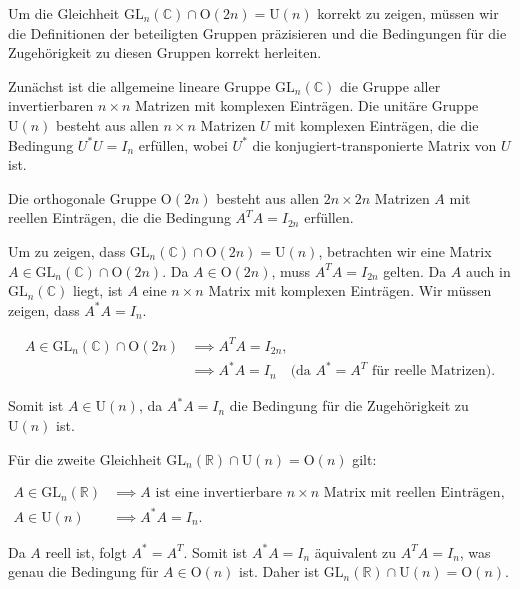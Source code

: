 Um die Gleichheit $\mathrm{GL}_n(\mathbb{C}) \cap \mathrm{O}(2n) = \mathrm{U}(n)$ korrekt zu zeigen, müssen wir die Definitionen der beteiligten Gruppen präzisieren und die Bedingungen für die Zugehörigkeit zu diesen Gruppen korrekt herleiten.

Zunächst ist die allgemeine lineare Gruppe $\mathrm{GL}_n(\mathbb{C})$ die Gruppe aller invertierbaren $n \times n$ Matrizen mit komplexen Einträgen. Die unitäre Gruppe $\mathrm{U}(n)$ besteht aus allen $n \times n$ Matrizen $U$ mit komplexen Einträgen, die die Bedingung $U^* U = I_n$ erfüllen, wobei $U^*$ die konjugiert-transponierte Matrix von $U$ ist.

Die orthogonale Gruppe $\mathrm{O}(2n)$ besteht aus allen $2n \times 2n$ Matrizen $A$ mit reellen Einträgen, die die Bedingung $A^T A = I_{2n}$ erfüllen.

Um zu zeigen, dass $\mathrm{GL}_n(\mathbb{C}) \cap \mathrm{O}(2n) = \mathrm{U}(n)$, betrachten wir eine Matrix $A \in \mathrm{GL}_n(\mathbb{C}) \cap \mathrm{O}(2n)$. Da $A \in \mathrm{O}(2n)$, muss $A^T A = I_{2n}$ gelten. Da $A$ auch in $\mathrm{GL}_n(\mathbb{C})$ liegt, ist $A$ eine $n \times n$ Matrix mit komplexen Einträgen. Wir müssen zeigen, dass $A^* A = I_n$.

\begin{align*}
A \in \mathrm{GL}_n(\mathbb{C}) \cap \mathrm{O}(2n) &\implies A^T A = I_{2n}, \\
&\implies A^* A = I_n \quad \text{(da $A^* = A^T$ für reelle Matrizen)}.
\end{align*}

Somit ist $A \in \mathrm{U}(n)$, da $A^* A = I_n$ die Bedingung für die Zugehörigkeit zu $\mathrm{U}(n)$ ist.

Für die zweite Gleichheit $\mathrm{GL}_n(\mathbb{R}) \cap \mathrm{U}(n) = \mathrm{O}(n)$ gilt:

\begin{align*}
A \in \mathrm{GL}_n(\mathbb{R}) &\implies A \text{ ist eine invertierbare } n \times n \text{ Matrix mit reellen Einträgen}, \\
A \in \mathrm{U}(n) &\implies A^* A = I_n.
\end{align*}

Da $A$ reell ist, folgt $A^* = A^T$. Somit ist $A^* A = I_n$ äquivalent zu $A^T A = I_n$, was genau die Bedingung für $A \in \mathrm{O}(n)$ ist. Daher ist $\mathrm{GL}_n(\mathbb{R}) \cap \mathrm{U}(n) = \mathrm{O}(n)$.

